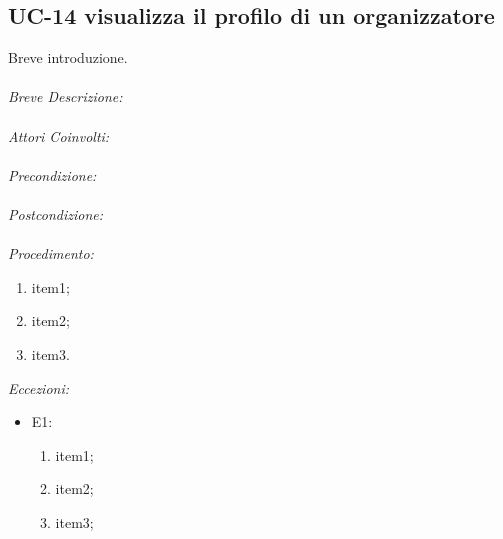 \subsection{UC-14 visualizza il profilo di un organizzatore}
Breve introduzione.
\\
\\
\textit{Breve Descrizione:} 
\\
\\
\textit{Attori Coinvolti:}
\\
\\
\textit{Precondizione:}
\\
\\
\textit{Postcondizione:}
\\
\\
\textit{Procedimento:}
\begin{enumerate}
	\item item1;
	\item item2;
	\item item3.
\end{enumerate}


\textit{Eccezioni:}
\begin{itemize}
	\item E1:
	\begin{enumerate}
		\item item1;
		\item item2;
		\item item3;
	\end{enumerate}
\end{itemize}